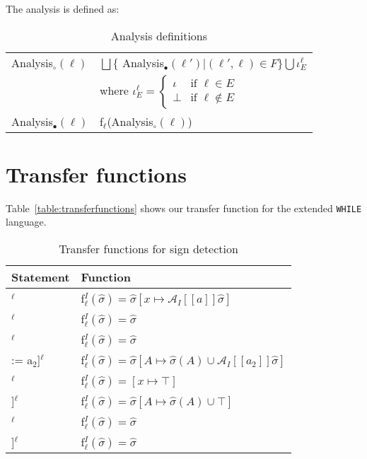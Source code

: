 \noindent The analysis is defined as:
\begin{table}[H]
\begin{tabular}{| l | l |}
  \hline
  Analysis$_\circ(\ell)$ & $ \bigsqcup \{$ Analysis$_\bullet (\ell') | (\ell', \ell) \in F \} \bigcup \iota_E^{\ell} $ \\
                         & where $\iota_E^{\ell} = \begin{cases} \iota & \text{if } \ell \in E \\ 
                                                                 \bot  & \text{if } \ell \notin E
                                                   \end{cases}$\\
  \hline
  Analysis$_\bullet(\ell)$ & f$_\ell$(Analysis$_\circ(\ell)$)\\
  \hline
\end{tabular}
\centering
\caption{Analysis definitions}
\end{table}

\section{Transfer functions}
Table~\ref{table:transferfunctions} shows our transfer function for the extended \texttt{WHILE} language.
\begin{table}[h]
\begin{tabular}{| l | l |}
  \hline
  Statement & Function \\
  \hline
  \hline
  [x := a]$^\ell$ & f$_\ell^I (\widehat{\sigma}) = \widehat{\sigma}[x \mapsto \mathcal{A}_I[\![a]\!] \widehat{\sigma} ]$ \\
  \hline
 [skip]$^\ell$ & f$_\ell^I (\widehat{\sigma}) = \widehat{\sigma}$\\
  \hline
 [b]$^\ell$ & f$_\ell^I (\widehat{\sigma}) = \widehat{\sigma}$\\
  \hline
  [A[a$_1$] := a$_2$]$^\ell$ & f$_\ell^I (\widehat{\sigma}) = \widehat{\sigma}[A\mapsto \widehat{\sigma}(A)\cup \mathcal{A}_I[\![a_2]\!] \widehat{\sigma}]$\\
  \hline
  [read x]$^\ell$ & f$_\ell^I (\widehat{\sigma}) = [x \mapsto \top]$ \\
  \hline
  [read A[a]]$^\ell$ & f$_\ell^I (\widehat{\sigma}) =  \widehat{\sigma}[A\mapsto \widehat{\sigma}(A)\cup \top]$\\
  \hline
  [write x]$^\ell$ & f$_\ell^I (\widehat{\sigma}) = \widehat{\sigma}$\\
  \hline
  [write A[n]]$^\ell$ & f$_\ell^I (\widehat{\sigma}) = \widehat{\sigma}$\\
  \hline
\end{tabular}
\centering
\caption{Transfer functions for sign detection}
\label{table:sign_detection_functions}
\end{table}


